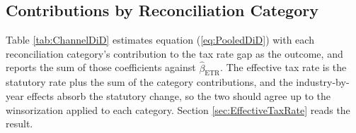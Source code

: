 \documentclass[11pt,letterpaper]{article}
\begin{document}
\subsection{Contributions by Reconciliation Category\label{app:channels}}

Table \ref{tab:ChannelDiD} estimates equation (\ref{eq:PooledDiD}) with each
reconciliation category's contribution to the tax rate gap as the outcome, and
reports the sum of those coefficients against $\hat\beta_{\text{ETR}}$. The
effective tax rate is the statutory rate plus the sum of the category
contributions, and the industry-by-year effects absorb the statutory change, so
the two should agree up to the winsorization applied to each category.
Section \ref{sec:EffectiveTaxRate} reads the result.


%
%
\end{document}
